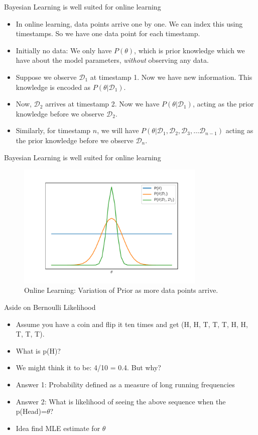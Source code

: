 \documentclass{beamer}
\begin{document}
\begin{frame}{Bayesian Learning is well suited for online learning}
\begin{itemize}[<+->]
\item In online learning, data points arrive one by one. We can index this using timestamps. So we have one data point for each timestamp.
\item Initially no data: We only have $P(\theta)$, which is prior knowledge which we have about the model parameters, \emph{without} observing any data.
\item Suppose we observe $\mathcal{D}_1$ at timestamp 1. Now we have new information. This knowledge is encoded as $P(\theta | \mathcal{D}_1)$. 
\item Now, $\mathcal{D}_2$ arrives at timestamp 2. Now we have $P(\theta | \mathcal{D}_1)$, acting as the prior knowledge before we observe $\mathcal{D}_2$.
\item Similarly, for timestamp $n$, we will have $P(\theta | \mathcal{D}_1, \mathcal{D}_2, \mathcal{D}_3, \dots \mathcal{D}_{n-1})$ acting as the prior knowledge before we observe $\mathcal{D}_n$.
\end{itemize}
\end{frame}

\begin{frame}{Bayesian Learning is well suited for online learning}
\begin{figure}[htp]
    \centering
    \includegraphics[width=9cm]{plots/online.pdf}
    \caption{Online Learning: Variation of Prior as more data points arrive.}
    \label{fig:online}
\end{figure}

\end{frame}

\begin{frame}{Aside on Bernoulli Likelihood}
\begin{itemize}[<+->]
	\item Assume you have a coin and flip it ten times and get (H, H, T, T, T, H, H, T, T, T).
	\item What is p(H)?
	\item We might think it to be: 4/10 = 0.4. But why?
	\item Answer 1: Probability defined as a measure of long running frequencies
	\item Answer 2: What is likelihood of seeing the above sequence when the p(Head)=$\theta$?
	\item Idea find MLE estimate for $\theta$
\end{itemize}

\end{frame}
\end{document}
